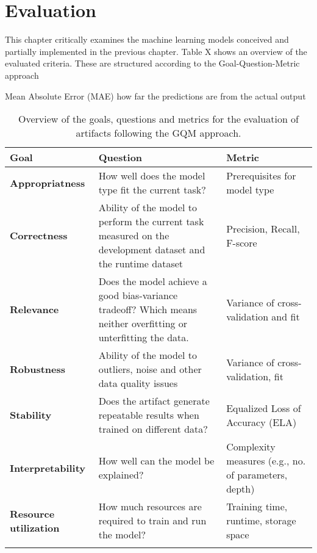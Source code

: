 \chapter{Evaluation}
This chapter critically examines the machine learning models conceived and partially implemented in the previous chapter.
Table X shows an overview of the evaluated criteria. These are structured according to the Goal-Question-Metric approach

Mean Absolute Error (MAE)
how far the predictions are from the actual output


\begin{longtable}{|l|p{6cm}|p{3cm}|}
    \hline
    \textbf{Goal}                 & \textbf{Question}                                                                                               & \textbf{Metric}                                      \\

    \hline
    \textbf{Appropriatness}       & How well does the model type fit the current task?                                                              & Prerequisites for model type                         \\
    \hline
    \textbf{Correctness}          & Ability of the model to perform the current task measured on the development dataset and the runtime dataset    &
    Precision, Recall, F-score                                                                                                                                                                             \\
    \hline
    \textbf{Relevance}            & Does the model achieve a good bias-variance tradeoff? Which means neither overfitting or unterfitting the data. & Variance of cross-validation and fit                 \\
    \hline
    \textbf{Robustness}           & Ability of the model to outliers, noise and other data quality issues                                           & Variance of cross-validation, fit                    \\
    \hline
    \textbf{Stability}            & Does the artifact generate repeatable results when trained on different data?                                   & Equalized Loss of Accuracy (ELA)                     \\
    \hline
    \textbf{Interpretability}     & How well can the model be explained?                                                                            & Complexity measures (e.g., no. of parameters, depth) \\
    \hline
    \textbf{Resource utilization} & How much resources are required to train and run the model?                                                     & Training time, runtime, storage space                \\
    \hline
    \caption{Overview of the goals, questions and metrics for the evaluation of artifacts following the \ac{GQM} approach.}
\end{longtable}

